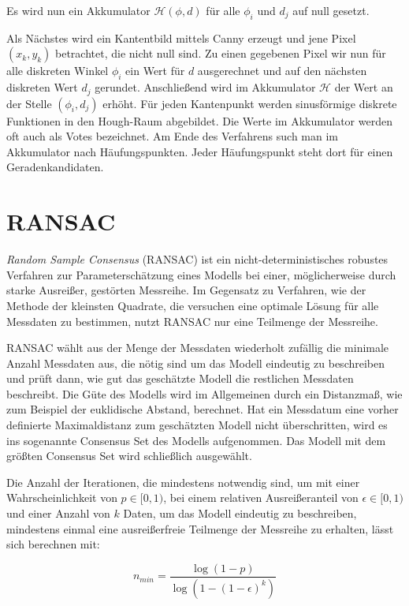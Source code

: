 Es wird nun ein Akkumulator $\mathcal{H}(\phi, d)$ für alle $\phi_i$ und $d_j$ auf null gesetzt.

Als Nächstes wird ein Kantentbild mittels Canny erzeugt und jene Pixel $(x_k,y_k)$ betrachtet, die nicht null sind.
Zu einen gegebenen Pixel wir nun für alle diskreten Winkel $\phi_i$ ein Wert für $d$ ausgerechnet und auf den nächsten diskreten Wert $d_j$ gerundet. Anschließend wird im Akkumulator  $\mathcal{H}$ der Wert an der Stelle $(\phi_i, d_j)$ erhöht. Für jeden Kantenpunkt werden sinusförmige diskrete Funktionen in den Hough-Raum abgebildet. Die Werte im Akkumulator werden oft auch als Votes bezeichnet.
Am Ende des Verfahrens such man im Akkumulator nach Häufungspunkten. Jeder Häufungspunkt steht dort für einen Geradenkandidaten.


\section{RANSAC}
\label{s:ransac}
\textit{Random Sample Consensus} (RANSAC) \cite{Fischler1981} ist ein nicht-deterministisches robustes Verfahren zur Parameterschätzung eines Modells bei einer, möglicherweise durch starke Ausreißer, gestörten Messreihe. 
Im Gegensatz zu Verfahren, wie der Methode der kleinsten Quadrate, die versuchen eine optimale Lösung für alle Messdaten zu bestimmen, nutzt RANSAC nur eine Teilmenge der Messreihe. 

RANSAC wählt aus der Menge der Messdaten wiederholt zufällig die minimale Anzahl Messdaten aus, die nötig sind um das Modell eindeutig zu beschreiben und prüft dann, wie gut das geschätzte Modell die restlichen Messdaten beschreibt. 
Die Güte des Modells wird im Allgemeinen durch ein Distanzmaß, wie zum Beispiel der euklidische Abstand, berechnet. 
Hat ein Messdatum eine vorher definierte Maximaldistanz zum geschätzten Modell nicht überschritten, wird es ins sogenannte Consensus Set des Modells aufgenommen. 
Das Modell mit dem größten Consensus Set wird schließlich ausgewählt. 

Die Anzahl der Iterationen, die mindestens notwendig sind, um mit einer Wahrscheinlichkeit von $p \in [0,1)$, bei einem relativen Ausreißeranteil von $\epsilon \in[0,1)$ und einer Anzahl von $k$ Daten, um das Modell eindeutig zu beschreiben, mindestens einmal eine ausreißerfreie Teilmenge der Messreihe zu erhalten, lässt sich berechnen mit:

\begin{equation}
n_{min} = \frac{\log{\left(1-p\right)}}{\log{\left(1-\left(1-\epsilon\right)^k\right)}}
\end{equation}


